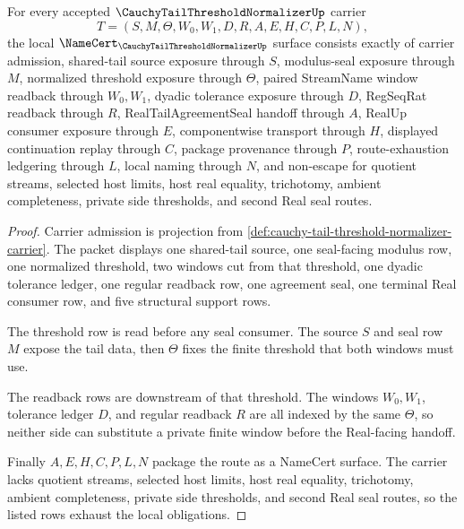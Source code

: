 \begin{theorem}
\label{thm:cauchy-tail-threshold-normalizer-namecert-obligations}
For every accepted $\CauchyTailThresholdNormalizerUp$ carrier
$$
T=(S,M,\Theta,W_0,W_1,D,R,A,E,H,C,P,L,N),
$$
the local $\NameCert_{\CauchyTailThresholdNormalizerUp}$ surface consists exactly of carrier admission, shared-tail source exposure through $S$, modulus-seal exposure through $M$, normalized threshold exposure through $\Theta$, paired StreamName window readback through $W_0,W_1$, dyadic tolerance exposure through $D$, RegSeqRat readback through $R$, RealTailAgreementSeal handoff through $A$, RealUp consumer exposure through $E$, componentwise transport through $H$, displayed continuation replay through $C$, package provenance through $P$, route-exhaustion ledgering through $L$, local naming through $N$, and non-escape for quotient streams, selected host limits, host real equality, trichotomy, ambient completeness, private side thresholds, and second Real seal routes.
\end{theorem}
\begin{proof}
Carrier admission is projection from \autoref{def:cauchy-tail-threshold-normalizer-carrier}. The packet displays one shared-tail source, one seal-facing modulus row, one normalized threshold, two windows cut from that threshold, one dyadic tolerance ledger, one regular readback row, one agreement seal, one terminal Real consumer row, and five structural support rows.

The threshold row is read before any seal consumer. The source $S$ and seal row $M$ expose the tail data, then $\Theta$ fixes the finite threshold that both windows must use.

The readback rows are downstream of that threshold. The windows $W_0,W_1$, tolerance ledger $D$, and regular readback $R$ are all indexed by the same $\Theta$, so neither side can substitute a private finite window before the Real-facing handoff.

Finally $A,E,H,C,P,L,N$ package the route as a NameCert surface. The carrier lacks quotient streams, selected host limits, host real equality, trichotomy, ambient completeness, private side thresholds, and second Real seal routes, so the listed rows exhaust the local obligations.
\end{proof}

